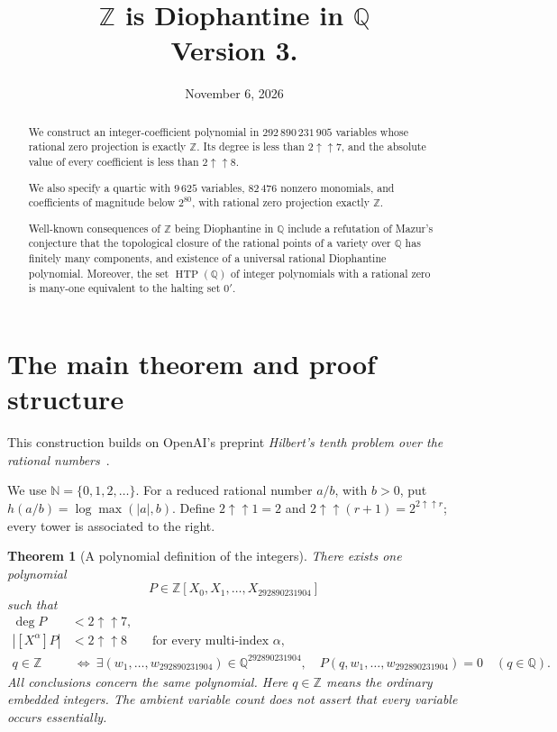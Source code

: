 \documentclass[11pt]{article}
\title{$\mathbb{Z}$ is Diophantine in $\mathbb{Q}$\\[4pt]\large Version 3.}
\author{}
\date{November 6, 2026}
\newtheorem{theorem}{Theorem}[section]
\theoremstyle{definition}
\theoremstyle{remark}
\newcommand{\Q}{\mathbb Q}
\newcommand{\Z}{\mathbb Z}
\newcommand{\N}{\mathbb N}
\newcommand{\tw}[1]{2\mathbin{\uparrow\!\uparrow}#1}
\begin{document}
\maketitle
\begin{abstract}
We construct an integer-coefficient polynomial in
$292\,890\,231\,905$ variables whose rational zero projection is exactly
$\Z$. Its degree is less than $2\mathbin{\uparrow\!\uparrow}7$, and the
absolute value of every coefficient is less than
$2\mathbin{\uparrow\!\uparrow}8$.

We also specify a quartic with $9\,625$ variables, $82\,476$ nonzero monomials, and coefficients of magnitude below $2^{80}$,
with rational zero projection exactly $\Z$.

Well-known consequences of $\Z$ being Diophantine in $\Q$ include a refutation of Mazur's conjecture that the topological closure of the rational points of a variety over $\Q$ has finitely many components, and existence of a universal rational Diophantine polynomial. Moreover, the set $\operatorname{HTP}(\Q)$ of integer polynomials with a rational zero is many-one equivalent to the halting set $0'$.
\end{abstract}
\tableofcontents

\section{The main theorem and proof structure}\label{sec:main}
This construction builds on OpenAI's preprint
\emph{Hilbert's tenth problem over the rational numbers}~\cite{openaihtp}.

We use $\N=\{0,1,2,\ldots\}$. For a reduced rational number $a/b$, with
$b>0$, put $h(a/b)=\log\max(|a|,b)$. Define $\tw1=2$ and
$\tw{(r+1)}=2^{\tw r}$; every tower is associated to the right.

\begin{theorem}[A polynomial definition of the integers]\label{thm:target}
There exists one polynomial
\[
 P\in\Z[X_0,X_1,\ldots,X_{292890231904}]
\]
such that
\begin{align*}
 \deg P&<\tw7,\\
 |[X^\alpha]P|&<\tw8\qquad\text{for every multi-index }\alpha,\\
 q\in\Z&\ \Longleftrightarrow\
 \exists(w_1,\ldots,w_{292890231904})\in\Q^{292890231904},\quad
 P(q,w_1,\ldots,w_{292890231904})=0\quad(q\in\Q).
\end{align*}
All conclusions concern the same polynomial. Here $q\in\Z$ means the
ordinary embedded integers. The ambient variable count does not assert that
every variable occurs essentially.
\end{theorem}
\end{document}

